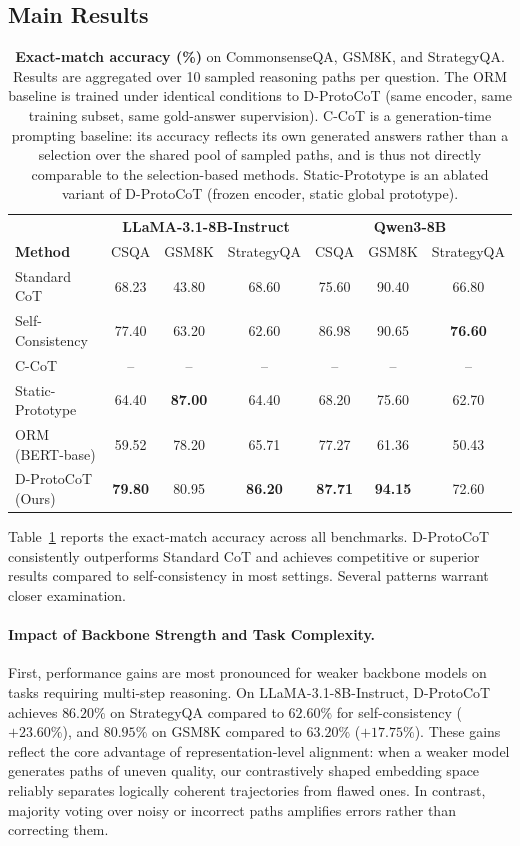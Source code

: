 \documentclass[a4paper,fleqn]{cas-dc}
\begin{document}
\subsection{Main Results}

\begin{table}[t]
\centering
\caption{\textbf{Exact-match accuracy (\%)} on CommonsenseQA, GSM8K, and StrategyQA. Results are aggregated over 10 sampled reasoning paths per question. The ORM baseline is trained under identical conditions to D-ProtoCoT (same encoder, same training subset, same gold-answer supervision). C-CoT is a generation-time prompting baseline: its accuracy reflects its own generated answers rather than a selection over the shared pool of sampled paths, and is thus not directly comparable to the selection-based methods. Static-Prototype is an ablated variant of D-ProtoCoT (frozen encoder, static global prototype).}
\label{tab:main-results}
\begin{tabular}{lccc|ccc}
\toprule
 & \multicolumn{3}{c|}{\textbf{LLaMA-3.1-8B-Instruct}} & \multicolumn{3}{c}{\textbf{Qwen3-8B}} \\
\textbf{Method} & CSQA & GSM8K & StrategyQA & CSQA & GSM8K & StrategyQA \\
\midrule
Standard CoT & 68.23 & 43.80 & 68.60 & 75.60 & 90.40 & 66.80 \\
Self-Consistency & 77.40 & 63.20 & 62.60 & 86.98 & 90.65 & \textbf{76.60} \\
C-CoT & -- & -- & -- & -- & -- & -- \\
\midrule
Static-Prototype & 64.40 & \textbf{87.00} & 64.40 & 68.20 & 75.60 & 62.70 \\
ORM (BERT-base) & 59.52 & 78.20 & 65.71 & 77.27 & 61.36 & 50.43 \\
D-ProtoCoT (Ours) & \textbf{79.80} & 80.95 & \textbf{86.20} & \textbf{87.71} & \textbf{94.15} & 72.60 \\
\bottomrule
\end{tabular}
\end{table}

Table~\ref{tab:main-results} reports the exact-match accuracy across all benchmarks. D-ProtoCoT consistently outperforms Standard CoT and achieves competitive or superior results compared to self-consistency in most settings. Several patterns warrant closer examination.

\paragraph{Impact of Backbone Strength and Task Complexity.}
First, performance gains are most pronounced for weaker backbone models on tasks requiring multi-step reasoning. On LLaMA-3.1-8B-Instruct, D-ProtoCoT achieves $86.20\%$ on StrategyQA compared to $62.60\%$ for self-consistency ($+23.60\%$), and $80.95\%$ on GSM8K compared to $63.20\%$ ($+17.75\%$). These gains reflect the core advantage of representation-level alignment: when a weaker model generates paths of uneven quality, our contrastively shaped embedding space reliably separates logically coherent trajectories from flawed ones. In contrast, majority voting over noisy or incorrect paths amplifies errors rather than correcting them.
\end{document}
